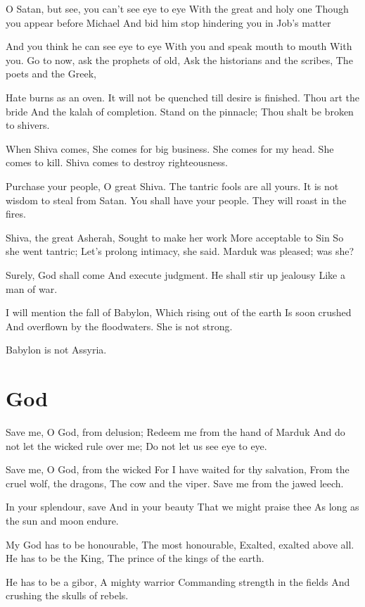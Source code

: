 \documentclass[
]{book}
\begin{document}
O Satan, but see, you can't see eye to eye
With the great and holy one
Though you appear before Michael
And bid him stop hindering you in Job's matter

And you think he can see eye to eye
With you and speak mouth to mouth
With you.
Go to now, ask the prophets of old,
Ask the historians and the scribes,
The poets and the Greek,

Hate burns as an oven.
It will not be quenched till desire is finished.
Thou art the bride
And the kalah of completion.
Stand on the pinnacle;
Thou shalt be broken to shivers.

When Shiva comes,
She comes for big business.
She comes for my head.
She comes to kill.
Shiva comes to destroy righteousness.

Purchase your people,
O great Shiva.
The tantric fools are all yours.
It is not wisdom to steal from Satan.
You shall have your people.
They will roast in the fires.

Shiva, the great Asherah,
Sought to make her work
More acceptable to Sin
So she went tantric;
Let's prolong intimacy, she said.
Marduk was pleased; was she?

Surely, God shall come
And execute judgment.
He shall stir up jealousy
Like a man of war.

I will mention the fall of Babylon,
Which rising out of the earth
Is soon crushed
And overflown by the floodwaters.
She is not strong.

Babylon is not Assyria.

\chapter{God}\label{god}

Save me, O God, from delusion;
Redeem me from the hand of Marduk
And do not let the wicked rule over me;
Do not let us see eye to eye.

Save me, O God, from the wicked
For I have waited for thy salvation,
From the cruel wolf, the dragons,
The cow and the viper.
Save me from the jawed leech.

In your splendour, save
And in your beauty
That we might praise thee
As long as the sun and moon endure.

My God has to be honourable,
The most honourable,
Exalted, exalted above all.
He has to be the King,
The prince of the kings of the earth.

He has to be a gibor,
A mighty warrior
Commanding strength in the fields
And crushing the skulls of rebels.
\end{document}
